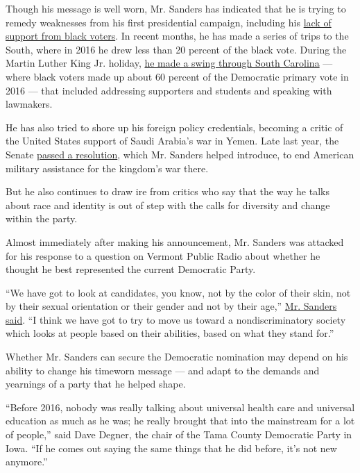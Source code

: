 Though his message is well worn, Mr. Sanders has indicated that he is
trying to remedy weaknesses from his first presidential campaign,
including his
\href{https://www.nytimes.com/2018/04/05/us/politics/bernie-sanders-obama-mississippi.html}{lack
of support from black voters}. In recent months, he has made a series of
trips to the South, where in 2016 he drew less than 20 percent of the
black vote. During the Martin Luther King Jr. holiday,
\href{https://www.nytimes.com/2019/01/22/us/politics/south-carolina-democrats-president.html}{he
made a swing through South Carolina} --- where black voters made up
about 60 percent of the Democratic primary vote in 2016 --- that
included addressing supporters and students and speaking with lawmakers.

He has also tried to shore up his foreign policy credentials, becoming a
critic of the United States support of Saudi Arabia's war in Yemen. Late
last year, the Senate
\href{https://www.nytimes.com/2018/12/13/us/politics/yemen-saudi-war-pompeo-mattis.html}{passed
a resolution}, which Mr. Sanders helped introduce, to end American
military assistance for the kingdom's war there.

But he also continues to draw ire from critics who say that the way he
talks about race and identity is out of step with the calls for
diversity and change within the party.

Almost immediately after making his announcement, Mr. Sanders was
attacked for his response to a question on Vermont Public Radio about
whether he thought he best represented the current Democratic Party.

``We have got to look at candidates, you know, not by the color of their
skin, not by their sexual orientation or their gender and not by their
age,''
\href{https://www.vpr.org/post/hes-2020-bernie-sanders-running-president-again\#stream/0}{Mr.
Sanders said}. ``I think we have got to try to move us toward a
nondiscriminatory society which looks at people based on their
abilities, based on what they stand for.''

Whether Mr. Sanders can secure the Democratic nomination may depend on
his ability to change his timeworn message --- and adapt to the demands
and yearnings of a party that he helped shape.

``Before 2016, nobody was really talking about universal health care and
universal education as much as he was; he really brought that into the
mainstream for a lot of people,'' said Dave Degner, the chair of the
Tama County Democratic Party in Iowa. ``If he comes out saying the same
things that he did before, it's not new anymore.''

